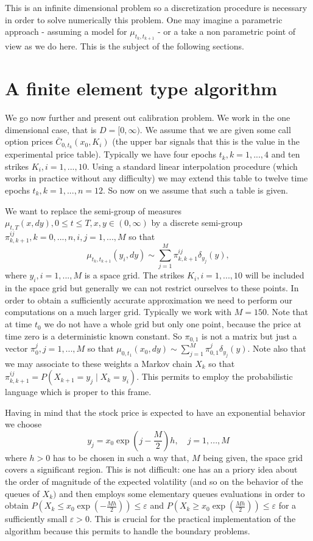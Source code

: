 \documentclass[a4paper]{article}
\begin{document}
This is an infinite dimensional problem so a discretization procedure is
necessary in order to solve numerically this problem. One may imagine a
parametric approach - assuming a model for $\mu _{t_{k},t_{k+1}}$ - or a
take a non parametric point of view as we do here. This is the subject of
the following sections.

\section{A finite element type algorithm \label{grid}}

We go now further and present out calibration problem. We work in the one
dimensional case, that is $D=[0,\infty ).$ We assume that we are given some
call option prices $\overline{C}_{0,t_{k}}(x_{0},K_{i})$ (the upper bar
signals that this is the value in the experimental price table). Typically
we have four epochs $t_{k},k=1,...,4$ and ten strikes $K_{i},i=1,...,10.$
Using a standard linear interpolation procedure (which works in practice
without any difficulty) we may extend this table to twelve time epochs $%
t_{k},k=1,...,n=12.$ So now on we assume that such a table is given.

We want to replace the semi-group of measures $\mu
_{t,T}(x,dy),0\leq t\leq T,x,y\in (0,\infty )$ by a discrete
semi-group $\pi _{k,k+1}^{ij},k=0,...,n,i,j=1,...,M$ so that
\[\mu _{t_{k},t_{k+1}}(y_{i},dy)\sim \sum_{j=1}^{M}\pi
_{k,k+1}^{ij}\delta _{y_{j}}(y),\] where $y_{i},i=1,...,M$ is a
space grid$.$ The strikes $K_{i},i=1,...,10$ will be included in
the space grid but generally we can not restrict ourselves to
these points. In order to obtain a sufficiently accurate
approximation we need to perform our computations on a much larger
grid. Typically we work with $M=150.$ Note that at time $t_{0}$
we do not have a whole grid but only one point, because the price
at time zero is a deterministic known constant. So $\pi _{0,1}$
is not a matrix but just a vector $\pi _{0}^{j},j=1,...,M$ so
that $\mu _{0,t_{1}}(x_{0},dy)\sim \sum_{j=1}^{M}\pi
_{0,1}^{j}\delta _{y_{j}}(y).$ Note also that we may associate to
these weights a Markov chain $X_{k}$ so that $\pi
_{k,k+1}^{ij}=P(X_{k+1}=y_{j}\mid X_{k}=y_{i}).$ This permits to
employ the probabilistic language which is proper to this frame.

Having in mind that the stock price is expected to have an exponential
behavior we choose
\[
y_{j}=x_{0}\exp (j-\frac{M}{2})h,\quad j=1,...,M
\]
where $h>0$ has to be chosen in such a way that, $M$ being given, the space
grid covers a significant region. This is not difficult: one has an a priory
idea about the order of magnitude of the expected volatility (and so on the
behavior of the queues of $X_{k})$ and then employs some elementary queues
evaluations in order to obtain $P(X_{k}\leq x_{0}\exp (-\frac{Mh}{2}))\leq
\varepsilon $ and $P(X_{k}\geq x_{0}\exp (\frac{Mh}{2}))\leq \varepsilon $
for a sufficiently small $\varepsilon >0.$ This is crucial for the practical
implementation of the algorithm because this permits to handle the boundary
problems.
\end{document}
